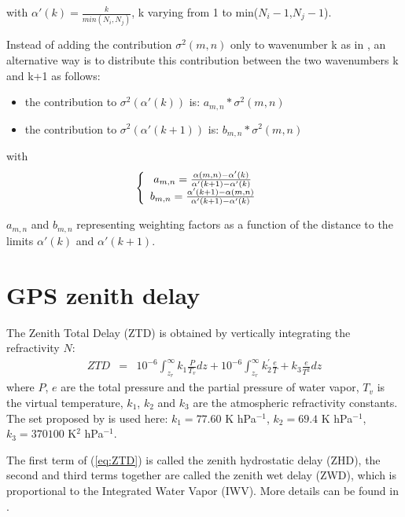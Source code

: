 with $\alpha'(k)=\frac{k}{min(N_{i},N_{j})}$, k varying from 1 to min($N_{i}-1$,$N_{j}-1$).

Instead of adding the contribution $\sigma^2(m,n)$ only to wavenumber k as in \citet{Denis2002}, an alternative way is to distribute this contribution between the two wavenumbers k and k+1 as follows:

\begin{itemize}
 \item the contribution to $\sigma^2(\alpha'(k))$ is: $a_{m,n} * \sigma^2(m,n)$
 \item the contribution to $\sigma^2(\alpha'(k+1))$ is: $b_{m,n} * \sigma^2(m,n)$
\end{itemize}



with 
\begin{eqnarray*}
\left\lbrace
\begin{array}{c c}
a_{m,n}=\frac{\alpha(m,n)-\alpha'(k)}{\alpha'(k+1)-\alpha'(k)} & \\
b_{m,n}=\frac{\alpha'(k+1)-\alpha(m,n)}{\alpha'(k+1)-\alpha'(k)} & \\
\end{array} 
\right.
\end{eqnarray*}

$a_{m,n}$ and $b_{m,n}$ representing weighting factors as a function of the distance to the limits $\alpha'(k)$ and $\alpha'(k+1)$.
%
\section{GPS zenith delay}
%
The Zenith Total Delay (ZTD) is obtained by vertically integrating the refractivity $N$:
\begin{eqnarray}
 ZTD&=&10^{-6}\int^{\infty}_{z_r} k_{1}\frac{P}{T_v}dz+10^{-6}\int^{\infty}_{z_r}k_2^{'}\frac{e}{T}+k_3\frac{e}{T^2}dz \label{eq:ZTD} 
\end{eqnarray}
where $P$, $e$ are the total pressure and the partial pressure of water vapor, $T_v$ is the virtual temperature, $k_1$, $k_2$ and $k_3$ are the atmospheric refractivity constants. The set proposed by \citet{Bevis1994} is used here: $k_1 =77.60$ K hPa$^{-1}$, $k_2=69.4 $ K hPa$^{-1}$, $k_3=370100$ K$^{2}$ hPa$^{-1}$.

The first term of (\ref{eq:ZTD}) is called the zenith hydrostatic delay (ZHD), the second and third terms together are called the zenith wet delay (ZWD), which is proportional to the Integrated Water Vapor (IWV). More details can be found in \citet{Brenot2006}.
%
